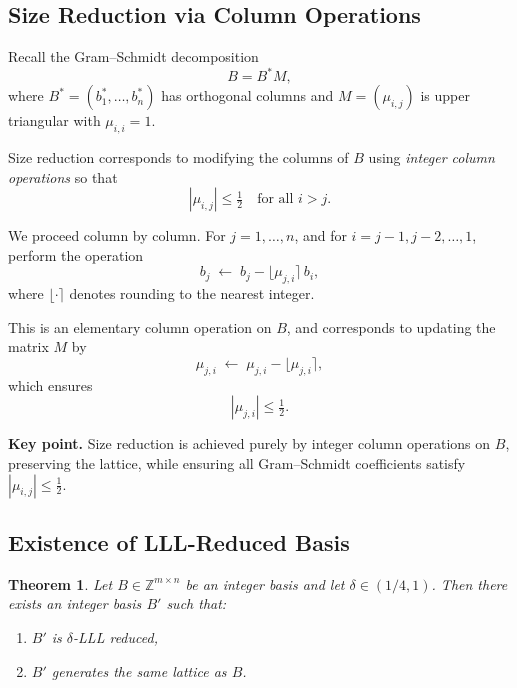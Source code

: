 \documentclass[11pt]{article}
\theoremstyle{plain}
\newtheorem{theorem}{Theorem}[section]
\theoremstyle{definition}
\newcommand{\Z}{\mathbb{Z}}
\begin{document}
\subsection{Size Reduction via Column Operations}

Recall the Gram--Schmidt decomposition
\[
  B = B^* M,
\]
where $B^* = (b_1^*, \dots, b_n^*)$ has orthogonal columns and
$M = (\mu_{i,j})$ is upper triangular with $\mu_{i,i} = 1$.

Size reduction corresponds to modifying the columns of $B$ using
\emph{integer column operations} so that
\[
  |\mu_{i,j}| \leq \tfrac{1}{2} \quad \text{for all } i > j.
\]

\medskip

We proceed column by column. For $j = 1, \dots, n$, and for
$i = j-1, j-2, \dots, 1$, perform the operation
\[
  b_j \;\leftarrow\; b_j - \lfloor \mu_{j,i} \rceil \, b_i,
\]
where $\lfloor \cdot \rceil$ denotes rounding to the nearest integer.

\medskip

This is an elementary column operation on $B$, and corresponds to updating
the matrix $M$ by
\[
  \mu_{j,i} \;\leftarrow\; \mu_{j,i} - \lfloor \mu_{j,i} \rceil,
\]
which ensures
\[
  |\mu_{j,i}| \leq \tfrac{1}{2}.
\]

\begin{keybox}
\textbf{Key point.}
Size reduction is achieved purely by integer column operations on $B$,
preserving the lattice, while ensuring all Gram--Schmidt coefficients
satisfy $|\mu_{i,j}| \leq \tfrac{1}{2}$.
\end{keybox}

\subsection{Existence of LLL-Reduced Basis}

\begin{theorem}
Let $B \in \Z^{m \times n}$ be an integer basis and let $\delta \in (1/4,1)$.
Then there exists an integer basis $B'$ such that:
\begin{enumerate}
  \item $B'$ is $\delta$-LLL reduced,
  \item $B'$ generates the same lattice as $B$.
\end{enumerate}
\end{theorem}
\end{document}
